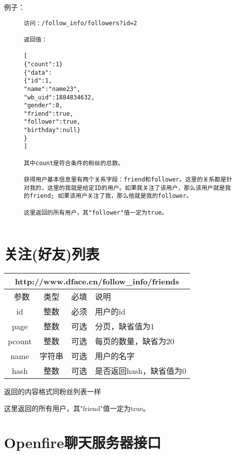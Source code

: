 \documentclass[cs4size]{ctexartutf8}
\begin{document}
例子：

\begin{figure}[H]
\begin{verbatim}
访问：/follow_info/followers?id=2

返回值：

[
{"count":1}
{"data":
{"id":1,
"name":"name23",
"wb_uid":1884834632,
"gender":0,
"friend":true,
"follower":true,
"birthday":null}
}
]

其中count是符合条件的粉丝的总数。

获得用户基本信息里有两个关系字段：friend和follower。这里的关系都是针对我的，这里的我就是给定ID的用户。如果我关注了该用户，那么该用户就是我的friend; 如果该用户关注了我，那么他就是我的follower。

这里返回的所有用户，其"follower"值一定为true。


\end{verbatim}
\end{figure}





\section{关注(好友)列表}

\begin{table}[H]
   \begin{center}
\begin{tabular}{|c|c|c|p{12cm}|}
\hline
\multicolumn{4}{|c|}{http://www.dface.cn/follow\_info/friends} \\
\hline\hline
 \  参数  & 类型 & 必填 &  说明  \\
\hline
 id  & 整数 & 必须 &  用户的id\\
   \hline
 page  & 整数 & 可选 & 分页，缺省值为1\\ 
 \hline
 pcount  & 整数 & 可选 & 每页的数量，缺省为20\\ 
     \hline
 name  & 字符串 & 可选 & 用户的名字\\ 
     \hline
 hash  & 整数 & 可选 & 是否返回hash，缺省值为0\\ 
\hline

\end{tabular}
   \end{center}
\end{table}

返回的内容格式同粉丝列表一样

这里返回的所有用户，其"friend"值一定为true。


\section{Openfire聊天服务器接口}
\end{document}
